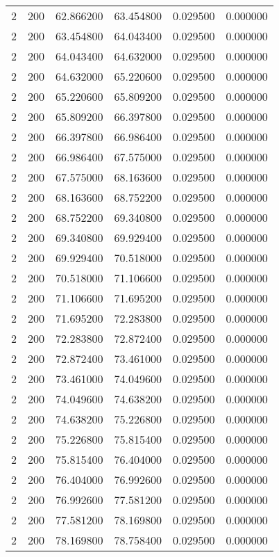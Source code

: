 \begin{longtable}{rrrrrr}
2 & 200 & 62.866200 & 63.454800 & 0.029500 & 0.000000 \\
2 & 200 & 63.454800 & 64.043400 & 0.029500 & 0.000000 \\
2 & 200 & 64.043400 & 64.632000 & 0.029500 & 0.000000 \\
2 & 200 & 64.632000 & 65.220600 & 0.029500 & 0.000000 \\
2 & 200 & 65.220600 & 65.809200 & 0.029500 & 0.000000 \\
2 & 200 & 65.809200 & 66.397800 & 0.029500 & 0.000000 \\
2 & 200 & 66.397800 & 66.986400 & 0.029500 & 0.000000 \\
2 & 200 & 66.986400 & 67.575000 & 0.029500 & 0.000000 \\
2 & 200 & 67.575000 & 68.163600 & 0.029500 & 0.000000 \\
2 & 200 & 68.163600 & 68.752200 & 0.029500 & 0.000000 \\
2 & 200 & 68.752200 & 69.340800 & 0.029500 & 0.000000 \\
2 & 200 & 69.340800 & 69.929400 & 0.029500 & 0.000000 \\
2 & 200 & 69.929400 & 70.518000 & 0.029500 & 0.000000 \\
2 & 200 & 70.518000 & 71.106600 & 0.029500 & 0.000000 \\
2 & 200 & 71.106600 & 71.695200 & 0.029500 & 0.000000 \\
2 & 200 & 71.695200 & 72.283800 & 0.029500 & 0.000000 \\
2 & 200 & 72.283800 & 72.872400 & 0.029500 & 0.000000 \\
2 & 200 & 72.872400 & 73.461000 & 0.029500 & 0.000000 \\
2 & 200 & 73.461000 & 74.049600 & 0.029500 & 0.000000 \\
2 & 200 & 74.049600 & 74.638200 & 0.029500 & 0.000000 \\
2 & 200 & 74.638200 & 75.226800 & 0.029500 & 0.000000 \\
2 & 200 & 75.226800 & 75.815400 & 0.029500 & 0.000000 \\
2 & 200 & 75.815400 & 76.404000 & 0.029500 & 0.000000 \\
2 & 200 & 76.404000 & 76.992600 & 0.029500 & 0.000000 \\
2 & 200 & 76.992600 & 77.581200 & 0.029500 & 0.000000 \\
2 & 200 & 77.581200 & 78.169800 & 0.029500 & 0.000000 \\
2 & 200 & 78.169800 & 78.758400 & 0.029500 & 0.000000 \\

\end{longtable}
